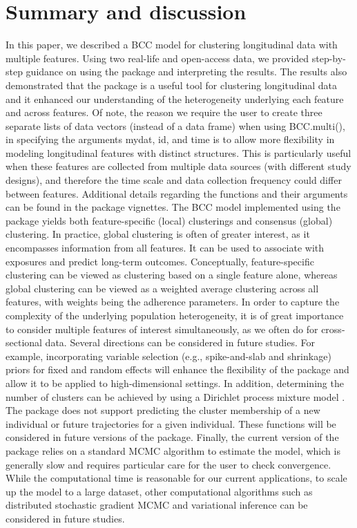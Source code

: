 \section{Summary and discussion} \label{sec:summary}
In this paper, we described a BCC model for clustering longitudinal data with multiple features. Using two real-life and open-access data, we provided step-by-step guidance on using the  package and interpreting the results. The results also demonstrated that the  package is a useful tool for clustering longitudinal data and it enhanced our understanding of the heterogeneity underlying each feature and across features. Of note, the reason we require the user to create three separate lists of data vectors (instead of a data frame) when using BCC.multi(), in specifying the arguments mydat, id, and time is to allow more flexibility in modeling longitudinal features with distinct structures. This is particularly useful when these features are collected from multiple data sources (with different study designs), and therefore the time scale and data collection frequency could differ between features. Additional details regarding the functions and their arguments can be found in the package vignettes.
The BCC model implemented using the  package yields both feature-specific (local) clusterings and consensus (global) clustering. In practice, global clustering is often of greater interest, as it encompasses information from all features. It can be used to associate with exposures and predict long-term outcomes. Conceptually, feature-specific clustering can be viewed as clustering based on a single feature alone, whereas global clustering can be viewed as a weighted average clustering across all features, with weights being the adherence parameters. In order to capture the complexity of the underlying population heterogeneity, it is of great importance to consider multiple features of interest simultaneously, as we often do for cross-sectional data. 
Several directions can be considered in future studies. For example, incorporating variable selection (e.g., spike-and-slab and shrinkage) priors \citep{Lu2021b, Lu2021} for fixed and random effects will enhance the flexibility of the package and allow it to be applied to high-dimensional settings. In addition, determining the number of clusters can be achieved by using a Dirichlet process mixture model \citep{Escobar1994, Lu2023a, Lu2024}. The package does not support predicting the cluster membership of a new individual or future trajectories for a given individual. These functions will be considered in future versions of the package. Finally, the current version of the  package relies on a standard MCMC algorithm to estimate the model, which is generally slow and requires particular care for the user to check convergence. While the computational time is reasonable for our current applications, to scale up the model to a large dataset, other computational algorithms such as distributed stochastic gradient MCMC \citep{Ahn2014} and variational inference \citep{Blei2017} can be considered in future studies.
